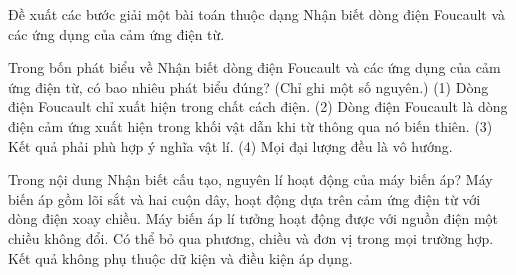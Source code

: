 \begin{bt}
Đề xuất các bước giải một bài toán thuộc dạng Nhận biết dòng điện Foucault và các ứng dụng của cảm ứng điện từ.
\end{bt}

\begin{ex}
Trong bốn phát biểu về Nhận biết dòng điện Foucault và các ứng dụng của cảm ứng điện từ, có bao nhiêu phát biểu đúng? (Chỉ ghi một số nguyên.) (1) Dòng điện Foucault chỉ xuất hiện trong chất cách điện. (2) Dòng điện Foucault là dòng điện cảm ứng xuất hiện trong khối vật dẫn khi từ thông qua nó biến thiên. (3) Kết quả phải phù hợp ý nghĩa vật lí. (4) Mọi đại lượng đều là vô hướng.
\end{ex}

\begin{ex}
Trong nội dung Nhận biết cấu tạo, nguyên lí hoạt động của máy biến áp?
\choice
{\True Máy biến áp gồm lõi sắt và hai cuộn dây, hoạt động dựa trên cảm ứng điện từ với dòng điện xoay chiều.}
{Máy biến áp lí tưởng hoạt động được với nguồn điện một chiều không đổi.}
{Có thể bỏ qua phương, chiều và đơn vị trong mọi trường hợp.}
{Kết quả không phụ thuộc dữ kiện và điều kiện áp dụng.}
\end{ex}

